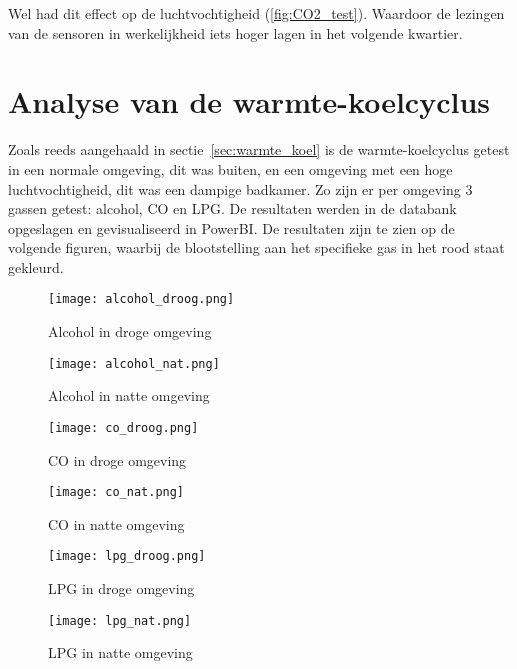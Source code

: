 Wel had dit effect op de luchtvochtigheid (\ref{fig:CO2_test}). Waardoor de lezingen van de sensoren in werkelijkheid iets hoger lagen in het volgende kwartier.




\section{Analyse van de warmte-koelcyclus}
\label{sec:analyse_mq7}

Zoals reeds aangehaald in sectie~\ref{sec:warmte_koel} is de warmte-koelcyclus getest in een normale omgeving, dit was buiten, en een omgeving met een hoge luchtvochtigheid, dit was een dampige badkamer. Zo zijn er per omgeving 3 gassen getest: alcohol, CO en LPG. De resultaten werden in de databank opgeslagen en gevisualiseerd in PowerBI. De resultaten zijn te zien op de volgende figuren, waarbij de blootstelling aan het specifieke gas in het rood staat gekleurd.

\begin{figure}[h!]
    \texttt{[image: alcohol\_droog.png]}
    \caption[Alcohol in droge omgeving]{Alcohol in droge omgeving}
    \label{fig:alcohol_droog}
\end{figure}

\begin{figure}[h!]
    \texttt{[image: alcohol\_nat.png]}
    \caption[Alcohol in natte omgeving]{Alcohol in natte omgeving}
    \label{fig:alcohol_nat}
\end{figure}

\begin{figure}[h!]
    \texttt{[image: co\_droog.png]}
    \caption[CO in droge omgeving]{CO in droge omgeving}
    \label{fig:co_droog}
\end{figure}

\begin{figure}[h!]
    \texttt{[image: co\_nat.png]}
    \caption[CO in natte omgeving]{CO in natte omgeving}
    \label{fig:co_nat}
\end{figure}

\begin{figure}[h!]
    \texttt{[image: lpg\_droog.png]}
    \caption[LPG in droge omgeving]{LPG in droge omgeving}
    \label{fig:lpg_droog}
\end{figure}

\begin{figure}[h!]
    \texttt{[image: lpg\_nat.png]}
    \caption[LPG in natte omgeving]{LPG in natte omgeving}
    \label{fig:lpg_nat}
\end{figure}


